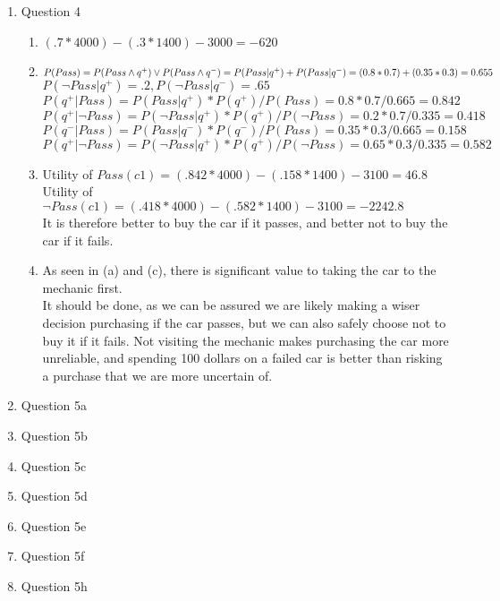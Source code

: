 \documentclass[11pt]{article}
\begin{document}
\begin{enumerate}
\item Question 4
\begin {enumerate}
\item $(.7 * 4000) - (.3 * 1400) - 3000 = -620$
\item $P(Pass) = P(Pass \land q^+) \vee P(Pass \land q^-) = P(Pass|q^+) + P(Pass|q^-) =
\\(0.8 * 0.7) + (0.35 * 0.3) = 0.655$
\\$P(\neg Pass | q^+) = .2, P(\neg Pass | q^-) = .65$
\\$P(q^+ | Pass) = P(Pass | q^+) * P(q^+) / P(Pass) = 0.8 * 0.7 / 0.665 = 0.842$
\\$P(q^+ | \neg Pass) = P(\neg Pass | q^+) * P(q^+) / P(\neg Pass) = 0.2 * 0.7 / 0.335 = 0.418$
\\$P(q^- | Pass) = P(Pass | q^-) * P(q^-) / P(Pass) = 0.35 * 0.3 / 0.665 = 0.158$
\\$P(q^+ | \neg Pass) = P(\neg Pass | q^+) * P(q^+) / P(\neg Pass) = 0.65 * 0.3 / 0.335 = 0.582$
\item Utility of $Pass(c1) = (.842 * 4000) - (.158 * 1400) - 3100 = 46.8$
\\Utility of $\neg Pass(c1) = (.418 * 4000) - (.582 * 1400) - 3100 = -2242.8$
\\It is therefore better to buy the car if it passes, and better not to buy the car if it fails.
\item As seen in (a) and (c), there is significant value to taking the car to the mechanic first.
\\It should be done, as we can be assured we are likely making a wiser decision purchasing if the car passes, but we can also safely choose not to buy it if it fails. Not visiting the mechanic makes purchasing the car more unreliable, and spending 100 dollars on a failed car is better than risking a purchase that we are more uncertain of.
\end {enumerate}

\item Question 5a

\item Question 5b

\item Question 5c

\item Question 5d

\item Question 5e

\item Question 5f

\item Question 5h

\end{enumerate}
\end{document}
